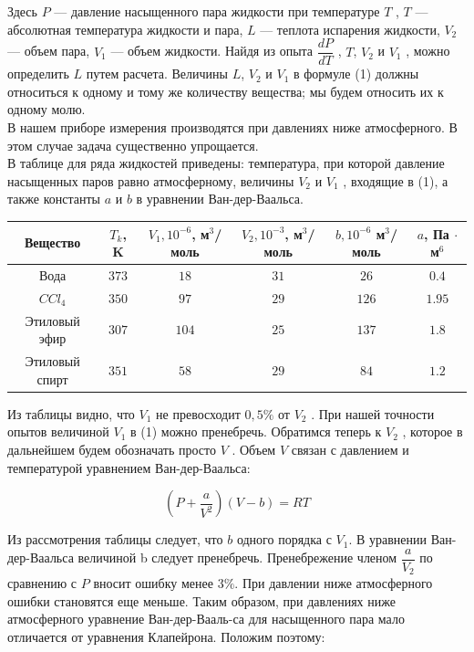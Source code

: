 \documentclass[12pt,a4paper]{article}
\begin{document}
Здесь $P$ — давление насыщенного пара жидкости при температуре $T$ , $T$ — абсолютная температура жидкости и пара, $L$ — теплота испарения жидкости, $V_2$ — объем пара, $V_1$ — объем жидкости. Найдя из опыта $\dfrac{dP}{dT}$ , $T$, $V_2$ и $V_1$ , можно определить $L$ путем расчета. Величины $L$, $V_2$ и $V_1$ в формуле (1) должны относиться к одному и тому
же количеству вещества; мы будем относить их к одному молю. \\

В нашем приборе измерения производятся при давлениях ниже атмосферного. В этом случае задача существенно упрощается.\\

В таблице для ряда жидкостей приведены: температура, при которой давление насыщенных паров равно атмосферному, величины $V_2$ и $V_1$ , входящие в (1), а также константы $a$ и $b$ в уравнении Ван-дер-Ваальса.

	\begin{tabular}{| c | c | c | c | c | c |} \hline
		 Вещество & $T_k$, K & $V_1, 10^{-6}$, м$^3$/моль & $V_2, 10^{-3}$, м$^3$/моль & $b, 10^{-6}$ м$^3$/моль & $a$, Па $\cdot$ м$^6$ \\ \hline
		 Вода & $373$ & $18$ & $31$ & $26$ & $0.4$ \\ 
		 $CCl_4$ & $350$ & $97$ & $29$ & $126$ & $1.95$ \\
		 Этиловый эфир & $307$ & $104$ & $25$ & $137$ & $1.8$ \\
		 Этиловый спирт & $351$ & $58$ & $29$ & $84$ & $1.2$ \\ \hline
	\end{tabular}
	
	Из таблицы видно, что $V_1$ не превосходит $0,5\%$ от $V_2$ . При нашей точности опытов величиной $V_1$ в (1) можно пренебречь. Обратимся теперь к $V_2$ , которое в дальнейшем будем обозначать просто $V$ . Объем $V$ связан с давлением и температурой уравнением Ван-дер-Ваальса:
	
	
	\begin{equation}
		\left( P + \dfrac{a}{V^2} \right) \left( V - b \right) = RT
	\end{equation}
	
	Из рассмотрения таблицы следует, что $b$ одного порядка с $V_1$. В уравнении Ван-дер-Ваальса величиной b следует пренебречь. Пренебрежение членом $\dfrac{a}{V_2}$ по сравнению с $P$ вносит ошибку менее $3\%$. При давлении ниже атмосферного ошибки становятся еще меньше. Таким образом, при давлениях ниже атмосферного уравнение Ван-дер-Вааль-са для насыщенного пара мало отличается от уравнения Клапейрона. Положим поэтому:
	
\end{document}
